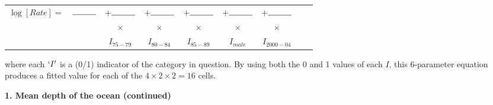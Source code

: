 \documentclass[10pt,handout]{beamer}\usepackage[]{graphicx}\usepackage[]{color}
\begin{document}
\begin{frame}
\begin{tabular}{c c c c c c c c c}
	$\log[Rate] =$ &$\rule{1cm}{0.15mm}$& $+  \rule{1cm}{0.15mm}$ & $+   \rule{1cm}{0.15mm}$ & $+   \rule{1cm}{0.15mm}$ & $+   \rule{1cm}{0.15mm} $ & $+ \rule{1cm}{0.15mm}$ \\
	& &  $\times$  &  $\times$ &  $\times$ & $\times$ & $\times$ & \\
	& &  $I_{75-79}$ & $I_{80-84}$ & $I_{85-89}$ & $I_{male}$ & $I_{2000-04}$ \\
\end{tabular}

where each $`I'$ is a (0/1) indicator of the category in question. By using both the 0 and 1 values of each $I$, this 6-parameter equation  produces a fitted value for each of the $4\times2\times2=16$ cells.

\end{frame}

\begin{frame}
	\vspace*{-5.0in}
	\textbf{1. Mean depth of the ocean (continued)}
	
\end{frame}
\end{document}
